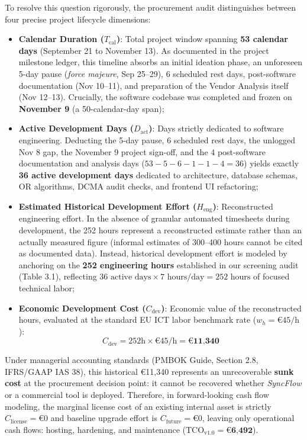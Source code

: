 To resolve this question rigorously, the procurement audit distinguishes between four precise project lifecycle dimensions:
\begin{itemize}[itemsep=1pt,topsep=1pt]
    \item \textbf{Calendar Duration ($T_{\text{cal}}$)}: Total project window spanning \textbf{53 calendar days} (September 21 to November 13). As documented in the project milestone ledger, this timeline absorbs an initial ideation phase, an unforeseen 5-day pause (\textit{force majeure}, Sep 25--29), 6 scheduled rest days, post-software documentation (Nov 10--11), and preparation of the Vendor Analysis itself (Nov 12--13). Crucially, the software codebase was completed and frozen on \textbf{November 9} (a 50-calendar-day span);
    \item \textbf{Active Development Days ($D_{\text{act}}$)}: Days strictly dedicated to software engineering. Deducting the 5-day pause, 6 scheduled rest days, the unlogged Nov 8 gap, the November 9 project sign-off, and the 4 post-software documentation and analysis days ($53 - 5 - 6 - 1 - 1 - 4 = 36$) yields exactly \textbf{36 active development days} dedicated to architecture, database schemas, OR algorithms, DCMA audit checks, and frontend UI refactoring;
    \item \textbf{Estimated Historical Development Effort ($H_{\text{eng}}$)}: Reconstructed engineering effort. In the absence of granular automated timesheets during development, the 252 hours represent a reconstructed estimate rather than an actually measured figure (informal estimates of 300--400 hours cannot be cited as documented data). Instead, historical development effort is modeled by anchoring on the \textbf{252 engineering hours} established in our screening audit (Table 3.1), reflecting $36\text{ active days} \times 7\text{ hours/day} = 252\text{ hours}$ of focused technical labor;
    \item \textbf{Economic Development Cost ($C_{\text{dev}}$)}: Economic value of the reconstructed hours, evaluated at the standard EU ICT labor benchmark rate ($w_h = \text{€}45/\text{h}$ \cite{eurostat}):
    \begin{equation*}
        C_{\text{dev}} = 252\text{h} \times \text{€}45/\text{h} = \textbf{€11,340}
    \end{equation*}
\end{itemize}

Under managerial accounting standards (PMBOK Guide, Section 2.8, IFRS/GAAP IAS 38), this historical €11,340 represents an unrecoverable \textbf{sunk cost} at the procurement decision point: it cannot be recovered whether \textit{SyncFlow} or a commercial tool is deployed. Therefore, in forward-looking cash flow modeling, the marginal license cost of an existing internal asset is strictly $C_{\text{license}} = \text{€}0$ and baseline upgrade effort is $C_{\text{future}} = \text{€}0$, leaving only operational cash flows: hosting, hardening, and maintenance ($\text{TCO}_{\text{v1.0}} = \textbf{€6,492}$).

